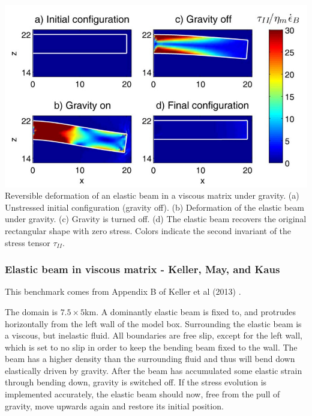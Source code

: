 \begin{center}
\includegraphics[width=14cm]{images/viscoelasticity/vosc15a}\\
{\captionfont 
Reversible deformation of an elastic beam in a viscous matrix under gravity. 
(a) Unstressed initial configuration (gravity off). 
(b) Deformation of the elastic beam under gravity. 
(c) Gravity is turned off. (d) The elastic beam recovers the original rectangular 
shape with zero stress. Colors indicate the second invariant of the stress 
tensor $\tau_{II}$.}
\end{center}



\subsubsection{Elastic beam in viscous matrix - Keller, May, and Kaus}


This benchmark comes from Appendix B of Keller et al (2013) \cite{kemk13}.

The domain is $7.5\times5$km. A dominantly elastic beam is fixed to, and protrudes horizontally 
from the left wall of the model box. 
Surrounding the elastic beam is a viscous, but inelastic fluid. 
All boundaries are free slip, except for the left wall, which is set to no slip in  
order to keep the bending beam fixed to the wall. The beam has a higher density than the surrounding fluid and 
thus will bend down elastically driven by gravity. After the beam has 
accumulated some elastic strain through bending down, gravity is switched off. 
If the stress evolution is implemented accurately, the elastic beam should now, 
free from the pull of gravity, move upwards again and restore its initial position. 

